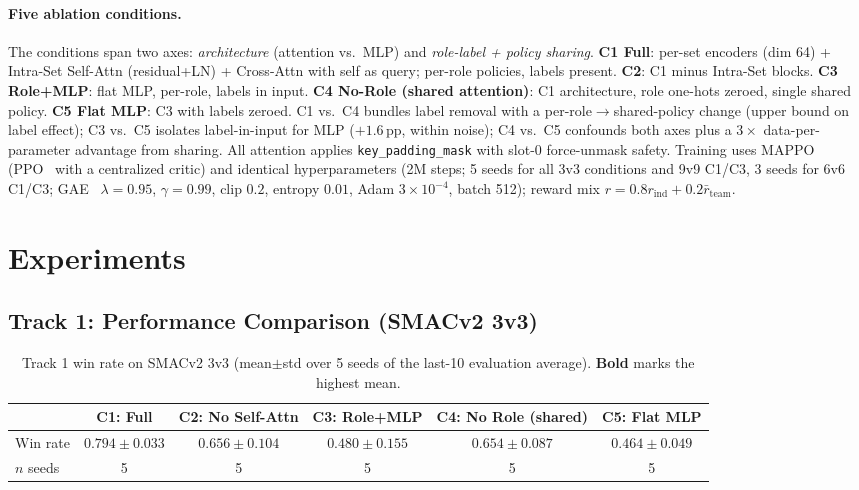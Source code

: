 \documentclass{nextgame2026}
\begin{document}
\paragraph{Five ablation conditions.} The conditions span two axes: \emph{architecture} (attention vs.\ MLP) and \emph{role-label + policy sharing}. \textbf{C1 Full}: per-set encoders (dim 64) + Intra-Set Self-Attn (residual+LN) + Cross-Attn with self as query; per-role policies, labels present. \textbf{C2}: C1 minus Intra-Set blocks. \textbf{C3 Role+MLP}: flat MLP, per-role, labels in input. \textbf{C4 No-Role (shared attention)}: C1 architecture, role one-hots zeroed, single shared policy. \textbf{C5 Flat MLP}: C3 with labels zeroed. C1 vs.\ C4 bundles label removal with a per-role$\to$shared-policy change (upper bound on label effect); C3 vs.\ C5 isolates label-in-input for MLP ($+1.6$\,pp, within noise); C4 vs.\ C5 confounds both axes plus a $3{\times}$ data-per-parameter advantage from sharing. All attention applies \texttt{key\_padding\_mask} with slot-0 force-unmask safety. Training uses MAPPO~\cite{mappo} (PPO~\cite{ppo2017} with a centralized critic) and identical hyperparameters (2M steps; 5 seeds for all 3v3 conditions and 9v9 C1/C3, 3 seeds for 6v6 C1/C3; GAE~\cite{gae2016} $\lambda{=}0.95$, $\gamma{=}0.99$, clip $0.2$, entropy $0.01$, Adam $3{\times}10^{-4}$, batch 512); reward mix $r=0.8 r_{\text{ind}}+0.2 \bar r_{\text{team}}$.

\section{Experiments}
\label{sec:experiments}

\subsection{Track 1: Performance Comparison (SMACv2 3v3)}

\begin{table}[t]
\centering\small
\setlength{\tabcolsep}{6pt}
\caption{Track 1 win rate on SMACv2 3v3 (mean$\pm$std over 5 seeds of the last-10 evaluation average). \textbf{Bold} marks the highest mean.}
\label{tab:track1}
\begin{tabular}{lccccc}
\toprule
 & C1: Full & C2: No Self-Attn & C3: Role+MLP & C4: No Role (shared) & C5: Flat MLP \\
\midrule
Win rate & $\mathbf{0.794{\pm}0.033}$ & $0.656{\pm}0.104$ & $0.480{\pm}0.155$ & $0.654{\pm}0.087$ & $0.464{\pm}0.049$ \\
$n$ seeds & 5 & 5 & 5 & 5 & 5 \\
\bottomrule
\end{tabular}
\end{table}
\end{document}
